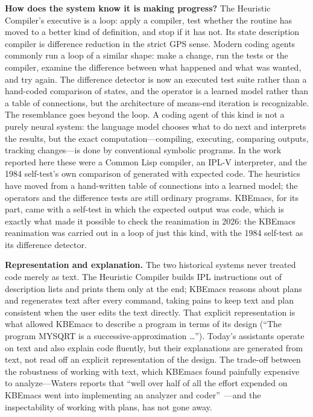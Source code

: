 \documentclass[11pt]{article}
\begin{document}
\textbf{How does the system know it is making progress?} The Heuristic
Compiler's executive is a loop: apply a compiler, test whether the
routine has moved to a better kind of definition, and stop if it has
not. Its state description compiler is difference reduction in the
strict GPS sense. Modern coding agents commonly run a loop of a similar
shape: make a change, run the tests or the compiler, examine the
difference between what happened and what was wanted, and try again.
The difference detector is now an executed test suite rather than a
hand-coded comparison of states, and the operator is a learned model
rather than a table of connections, but the architecture of
means-end iteration is recognizable. The resemblance goes beyond the
loop. A coding agent of this kind is not a purely neural system: the
language model chooses what to do next and interprets the results, but
the exact computation---compiling, executing, comparing outputs,
tracking changes---is done by conventional symbolic programs. In the
work reported here these were a Common Lisp compiler, an IPL-V
interpreter, and the 1984 self-test's own comparison of generated with
expected code. The heuristics have moved from a hand-written table of
connections into a learned model; the operators and the difference
tests are still ordinary programs. KBEmacs, for its part, came with a
self-test in which the expected output was code, which is exactly what
made it possible to check the reanimation in 2026: the KBEmacs
reanimation was carried out in a loop of just this kind, with the 1984
self-test as its difference detector.

\textbf{Representation and explanation.} The two historical systems
never treated code merely as text. The Heuristic Compiler builds IPL
instructions out of description lists and prints them only at the end;
KBEmacs reasons about plans and regenerates text after every command,
taking pains to keep text and plan consistent when the user edits the
text directly. That explicit representation is what allowed KBEmacs to
describe a program in terms of its design (``The program MYSQRT is a
successive-approximation \ldots''). Today's assistants operate on text
and also explain code fluently, but their explanations are generated
from text, not read off an explicit representation of the design.
The trade-off between the robustness of working with text, which KBEmacs
found painfully expensive to analyze---Waters reports that ``well over
half of all the effort expended on KBEmacs went into implementing an
analyzer and coder''~\cite[p.~55]{waters1986aimag}---and the
inspectability of working with plans, has not gone away.
\end{document}
